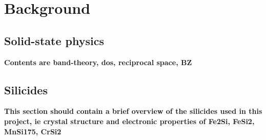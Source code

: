 \chapter{Background}
\label{sec:background}

\section{Solid-state physics}
\textbf{Contents are band-theory, dos, reciprocal space, BZ}

\section{Silicides}
\textbf{This section should contain a brief overview of the silicides used in this project, ie crystal structure and electronic properties of Fe2Si, FeSi2, MnSi175, CrSi2}